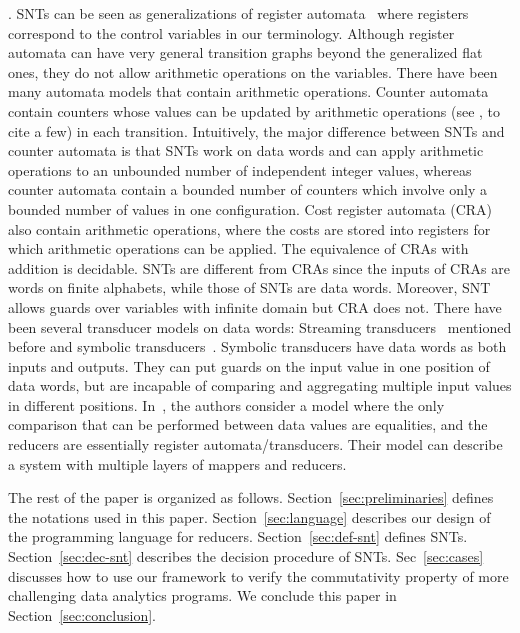 .
SNTs can be seen as generalizations of register automata~\cite{KF94,NSV04} where registers correspond to the control variables in our terminology. Although register automata can have very general transition graphs beyond the generalized flat ones, they do not allow arithmetic operations on the variables.
There have been many automata models that contain arithmetic operations. Counter automata contain counters whose values can be updated by arithmetic operations (see \cite{Iba78,CJ98,LS06,HH14,FGH13}, to cite a few) in each transition.  Intuitively, the major difference between SNTs and counter automata is that SNTs work on data words and can apply arithmetic operations to an unbounded number of independent integer values, whereas  counter automata contain a bounded number of counters which involve only a bounded number of values in one configuration. Cost register automata (CRA)~\cite{ADD+13} also contain arithmetic operations, where the costs are stored into registers for which arithmetic operations can be applied. The equivalence of CRAs with addition is decidable. SNTs are different from CRAs since the inputs of CRAs are words on finite alphabets, while those of SNTs are data words. 
Moreover, SNT allows guards over variables with infinite domain but CRA does not. 
%
%
There have been several transducer models on data words: Streaming transducers~\cite{RP11} mentioned before and symbolic transducers~\cite{VHL+12}. Symbolic transducers have data words as both inputs and outputs. They can put guards on the input value in one position of data words, but are incapable of comparing and aggregating multiple input values in different positions. 
In~\cite{NSS+15}, the authors consider a model where
the only comparison that can be performed between data values are equalities, and
the reducers are essentially register automata/transducers.
Their model can describe a system with multiple layers of mappers and reducers.

The rest of the paper is organized as follows. Section~\ref{sec:preliminaries} defines the notations used in this paper. Section~\ref{sec:language} describes our design of the programming language for reducers. Section~\ref{sec:def-snt} defines SNTs. Section~\ref{sec:dec-snt} describes the decision procedure of SNTs. Sec~\ref{sec:cases} discusses how to use our framework to verify the commutativity property of more challenging data analytics programs. We conclude this paper in Section~\ref{sec:conclusion}. 